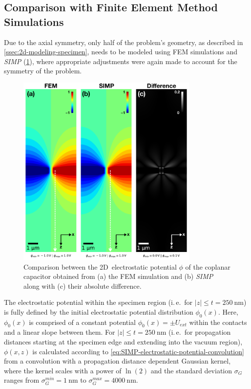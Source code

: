 \subsection{Comparison with Finite Element Method Simulations}
Due to the axial symmetry, only half of the problem's geometry, as described in \cref{ssec:2d-modeling-specimen}, needs to be modeled using FEM simulations and \emph{SIMP} (\cref{fig:capacitor-FEM-SIMP-comparison}), where appropriate adjustments were again made to account for the symmetry of the problem.
\begin{figure}[H]
	\centering
	\includegraphics[width=0.8\textwidth]{Figures/Results/Capacitor/Simulations/capacitor-FEM-SIMP-comparison.pdf}
	\caption{Comparison between the 2D~electrostatic potential $\phi$ of the coplanar capacitor obtained from (a) the FEM simulation and (b) \emph{SIMP} along with (c) their absolute difference.}
	\label{fig:capacitor-FEM-SIMP-comparison}
\end{figure}
The electrostatic potential within the specimen region (i.\,e.\ for $\lvert z \rvert \le t = \SI{250}{\nm}$) is fully defined by the initial electrostatic potential distribution $\phi_0\left(x\right)$. Here, $\phi_0\left(x\right)$ is comprised of a constant potential $\phi_0\left(x\right) = \pm U_{\mathit{ext}}$ within the contacts and a linear slope between them. For $\lvert z \rvert \le t = \SI{250}{\nm}$ (i.\,e.\ for propagation distances starting at the specimen edge and extending into the vacuum region), $\phi \left(x, z\right)$ is calculated according to \cref{eq:SIMP-electrostatic-potential-convolution} from a convolution with a propagation distance dependent Gaussian kernel, where the kernel scales with a power of $\ln\left(2\right)$ and the standard deviation $\sigma_G$ ranges from $\sigma_G^{\mathit{min}} = \SI{1}{\nm}$ to $\sigma_G^{\mathit{max}} = \SI{4000}{\nm}$.

